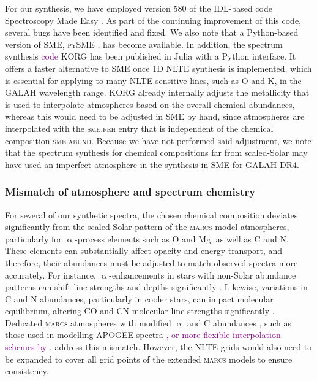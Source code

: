 \documentclass[
  journal=pasa,
  manuscript=research-paper, %
  year=2024,
  volume=37
]{cup-journal}
\newcommand{\adjusted}[1]{{\textcolor{purple}{#1}}}
\newcommand{\marcs}{\textsc{marcs}\xspace}
\begin{document}
For our synthesis, we have employed version 580 of the IDL-based code Spectroscopy Made Easy \citep{Valenti1996, Piskunov2017}. As part of the continuing improvement of this code, several bugs have been identified and fixed. We also note that a Python-based version of \textsc{SME}, \textsc{pySME} \citep{Wehrhahn2023}, has become available. In addition, the spectrum synthesis \adjusted{code} \textsc{KORG} \citep{Wheeler2023, Wheeler2024} has been published in Julia with a Python interface. It offers a faster alternative to \textsc{SME} once 1D NLTE synthesis is implemented, which is essential for applying to many NLTE-sensitive lines, such as O and K, in the GALAH wavelength range. \textsc{KORG} already internally adjusts the metallicity that is used to interpolate atmospheres based on the overall chemical abundances, whereas this would need to be adjusted in \textsc{SME} by hand, since atmospheres are interpolated with the \textsc{sme.feh} entry that is independent of the chemical composition \textsc{sme.abund}. Because we have not performed said adjustment, we note that the spectrum synthesis for chemical compositions far from scaled-Solar may have used an imperfect atmosphere in the synthesis in \textsc{SME} for GALAH DR4.

\subsubsection{Mismatch of atmosphere and spectrum chemistry}

For several of our synthetic spectra, the chosen chemical composition deviates significantly from the scaled-Solar pattern of the \marcs model atmospheres, particularly for $\upalpha$-process elements such as O and Mg, as well as C and N. These elements can substantially affect opacity and energy transport, and therefore, their abundances must be adjusted to match observed spectra more accurately. For instance, $\upalpha$-enhancements in stars with non-Solar abundance patterns can shift line strengths and depths significantly \citep{Asplund2005, VandenBerg2012}. Likewise, variations in C and N abundances, particularly in cooler stars, can impact molecular equilibrium, altering CO and CN molecular line strengths significantly \citep{Tsuji1976, Smith2013}. Dedicated \marcs atmospheres with modified $\upalpha$ and C abundances \adjusted{\citep{Meszaros2012, Joensson2020}}, such as those used in modelling APOGEE spectra \citep{SDSSDR17}\adjusted{, or more flexible interpolation schemes by \citet{WestendorpPlaza2023}}, address this mismatch. However, the NLTE grids would also need to be expanded to cover all grid points of the extended \marcs models to ensure consistency.
\end{document}
